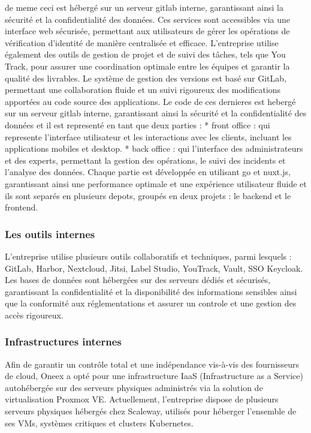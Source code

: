 de meme ceci est hébergé sur un serveur gitlab interne, garantissant ainsi la sécurité et la confidentialité des données.
Ces services sont accessibles via une interface web sécurisée, permettant aux utilisateurs de gérer les opérations de vérification d’identité de manière centralisée et efficace.
L’entreprise utilise également des outils de gestion de projet et de suivi des tâches, tels que You
Track, pour assurer une coordination optimale entre les équipes et garantir la qualité des livrables.
Le système de gestion des versions est basé sur GitLab, permettant une collaboration fluide et un
suivi rigoureux des modifications apportées au code source des applications.
Le code de ces dernieres est hebergé sur un serveur gitlab interne, garantissant ainsi la sécurité et la confidentialité des données et il est representé en tant que deux parties :
* front office : qui represente l'interface utilisateur et les interactions avec les clients, incluant les applications mobiles et desktop.
* back office : qui l'interface des administrateurs et des experts, permettant la gestion des opérations, le suivi des incidents et l'analyse des données.
Chaque partie est développée en utilisant go et nuxt.js, garantissant ainsi une performance optimale et une expérience utilisateur fluide et ils sont separés en plusieurs depots, groupés en deux projets : le backend et le frontend.

\subsubsection{Les outils internes}

L’entreprise utilise plusieurs outils collaboratifs et techniques, parmi lesquels :
GitLab, Harbor, Nextcloud, Jitsi, Label Studio, YouTrack, Vault, SSO Keycloak.
Les bases de données sont hébergées sur des serveurs dédiés et sécurisés, garantissant la confidentialité et la disponibilité des informations sensibles ainsi que la conformité aux réglementations et assurer un controle et une gestion des accès rigoureux.

\subsubsection{Infrastructures internes}

Afin de garantir un contrôle total et une indépendance vis-à-vis des fournisseurs de cloud, Oneex a opté pour une infrastructure IaaS (Infrastructure as a Service) autohébergée sur des serveurs physiques administrés via la solution de virtualisation Proxmox VE.
Actuellement, l'entreprise dispose de plusieurs serveurs physiques hébergés chez Scaleway, utilisés pour héberger l’ensemble de ses VMs, systèmes critiques et clusters Kubernetes.

